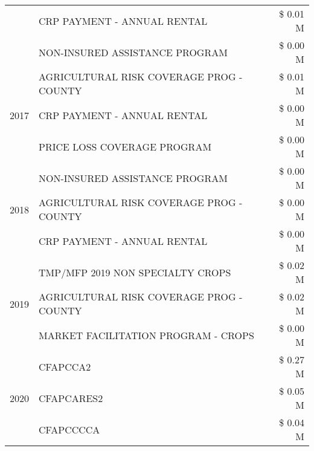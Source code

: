 \begin{tabular}{llr}
 & CRP PAYMENT - ANNUAL RENTAL & \$ 0.01 M \\
 & NON-INSURED ASSISTANCE PROGRAM & \$ 0.00 M \\
\cline{1-3}
\multirow[t]{3}{*}{2017} & AGRICULTURAL RISK COVERAGE PROG - COUNTY & \$ 0.01 M \\
 & CRP PAYMENT - ANNUAL RENTAL & \$ 0.00 M \\
 & PRICE LOSS COVERAGE PROGRAM & \$ 0.00 M \\
\cline{1-3}
\multirow[t]{3}{*}{2018} & NON-INSURED ASSISTANCE PROGRAM & \$ 0.00 M \\
 & AGRICULTURAL RISK COVERAGE PROG - COUNTY & \$ 0.00 M \\
 & CRP PAYMENT - ANNUAL RENTAL & \$ 0.00 M \\
\cline{1-3}
\multirow[t]{3}{*}{2019} & TMP/MFP 2019 NON SPECIALTY CROPS & \$ 0.02 M \\
 & AGRICULTURAL RISK COVERAGE PROG - COUNTY & \$ 0.02 M \\
 & MARKET FACILITATION PROGRAM - CROPS & \$ 0.00 M \\
\cline{1-3}
\multirow[t]{3}{*}{2020} & CFAPCCA2 & \$ 0.27 M \\
 & CFAPCARES2 & \$ 0.05 M \\
 & CFAPCCCCA & \$ 0.04 M \\
\cline{1-3}
\bottomrule
\end{tabular}
